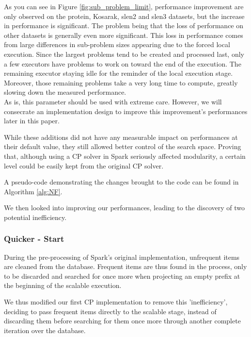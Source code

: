 \documentclass{eplmastersthesis}
\begin{document}
\begin{enumerate}
	 As you can see in Figure \ref{fig:sub_problem_limit}, performance improvement are only observed on the protein, Kosarak, slen2 and slen3 datasets, but the increase in performance is significant. The problem being that the loss of performance on other datasets is generally even more significant. This loss in performance comes from large differences in sub-problem sizes appearing due to the forced local execution. Since the largest problems tend to be created and processed last, only a few executors have problems to work on toward the end of the execution. The remaining executor staying idle for the reminder of the local execution stage. Moreover, those remaining problems take a very long time to compute, greatly slowing down the measured performance. \\
	 As is, this parameter should be used with extreme care. However, we will consecrate an implementation design to improve this improvement's performances later in this paper.
\end{enumerate}

While these additions did not have any measurable impact on performances at their default value, they still allowed better control of the search space. Proving that, although using a CP solver in Spark seriously affected modularity, a certain level could be easily kept from the original CP solver. \newline

A pseudo-code demonstrating the changes brought to the code can be found in Algorithm \ref{alg:NF}. \newline

We then looked into improving our performances, leading to the discovery of two potential inefficiency.

\subsubsection{Quicker - Start}

During the pre-processing of Spark's original implementation, unfrequent items are cleaned from the database. Frequent items are thus found in the process, only to be discarded and searched for once more when projecting an empty prefix at the beginning of the scalable execution. \newline

We thus modified our first CP implementation to remove this 'inefficiency', deciding to pass frequent items directly to the scalable stage, instead of discarding them before searching for them once more through another complete iteration over the database. \newline
\end{document}
